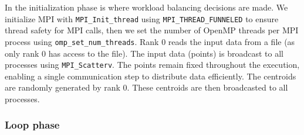 \documentclass[11pt, journal]{IEEEtran}
\begin{document}
In the initialization phase is where workload balancing decisions are made. We initialize MPI with \verb|MPI_Init_thread| using \verb|MPI_THREAD_FUNNELED| to ensure thread safety for MPI calls, then we set the number of OpenMP threads per MPI process using \verb|omp_set_num_threads|. Rank 0 reads the input data from a file (as only rank 0 has access to the file). The input data (points) is broadcast to all processes using \verb|MPI_Scatterv|. The points remain fixed throughout the execution, enabling a single communication step to distribute data efficiently. The centroids are randomly generated by rank 0. These centroids are then broadcasted to all processes.

\subsubsection{Loop phase}
\end{document}
